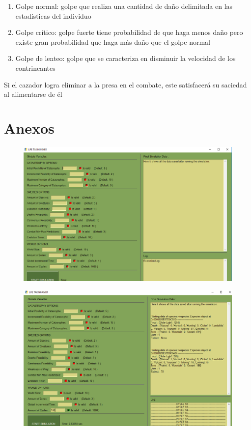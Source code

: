 \documentclass{llncs}
\begin{document}
\begin{enumerate}
	\item Golpe normal: golpe que realiza una cantidad de daño delimitada en las estadísticas del individuo
	\item Golpe crítico: golpe fuerte tiene probabilidad de que haga menos daño pero existe gran probabilidad que haga más daño que el golpe normal
	\item Golpe de lenteo: golpe que se caracteriza en disminuir la velocidad de los contrincantes
\end{enumerate}

Si el cazador logra eliminar a la presa en el combate, este satisfacerá su saciedad al alimentarse de él

\section{Anexos}
     
\begin{figure}
	\centering
	\includegraphics[width=1.0\linewidth]{imagenesapk/HomeForm}
	\label{fig:homeform}
\end{figure}

\begin{figure}
	\centering
	\includegraphics[width=1.0\linewidth]{imagenesapk/ResultForm}
	\label{fig:resultform}
\end{figure}
\end{document}
